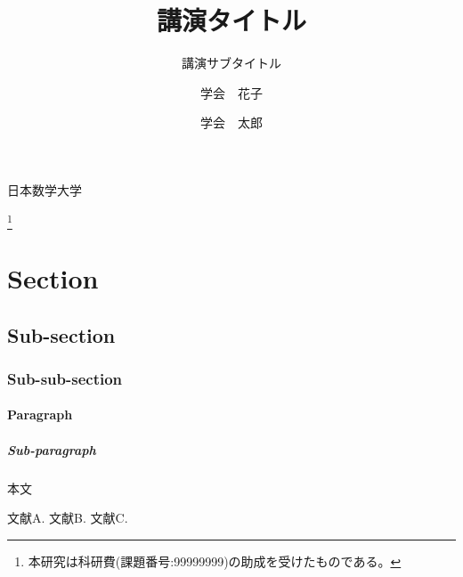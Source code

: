 \documentclass{msjproc}
\begin{document}
  \title{講演タイトル}
  \subtitle{講演サブタイトル}

  \author{学会　花子}{日本数学大学}
  \address{〒110-0016 東京都台東区台東1-34-8　日本数学大学 大学院理学研究科}

  \author{学会　太郎}{}


  \thanks{本研究は科研費(課題番号:99999999)の助成を受けたものである。}

  \maketitle


  \section{Section}
  \subsection{Sub-section}
  \subsubsection{Sub-sub-section}
  \paragraph{Paragraph}
  \subparagraph{Sub-paragraph}
  本文

  \begin{thebibliography}{9}
    文献A.
    文献B.
    文献C.
  \end{thebibliography}

\end{document}
